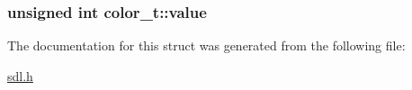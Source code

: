 \subsubsection[{\texorpdfstring{value}{value}}]{\setlength{\rightskip}{0pt plus 5cm}unsigned int color\+\_\+t\+::value}\hypertarget{structcolor__t_ae346ea49d8896a5233739803fdc1671c}{}\label{structcolor__t_ae346ea49d8896a5233739803fdc1671c}


The documentation for this struct was generated from the following file\+:\begin{DoxyCompactItemize}
\item 
\hyperlink{sdl_8h}{sdl.\+h}\end{DoxyCompactItemize}
